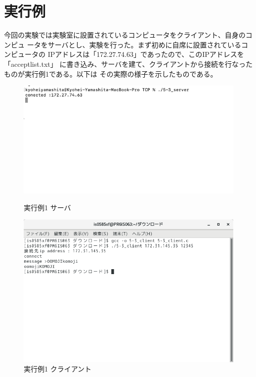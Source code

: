 \documentclass[dvipdfmx,autodetect-engine,titlepage]{jsarticle}
\begin{document}
\section{実行例}
今回の実験では実験室に設置されているコンピュータをクライアント、自身のコンピュ
ータをサーバとし、実験を行った。まず初めに自席に設置されているコンピュータの
IPアドレスは「172.27.74.63」であったので、このIPアドレスを「acceptlist.txt」
に書き込み、サーバを建て、クライアントから接続を行なったものが実行例1である。以下は
その実際の様子を示したものである。

\begin{figure}[h]
    \centering
    \begin{minipage}[b]{0.45\linewidth}
    \begin{center}
      \includegraphics[keepaspectratio,scale=0.45]{pic3.png}
      \end{center}
      \caption{実行例1 サーバ}
    \end{minipage}
    \begin{minipage}[b]{0.45\linewidth}
    \begin{center}
      \includegraphics[keepaspectratio,scale=0.35]{pic1.png}
      \end{center}
      \caption{実行例1 クライアント}
    \end{minipage}
  \end{figure}
\end{document}
